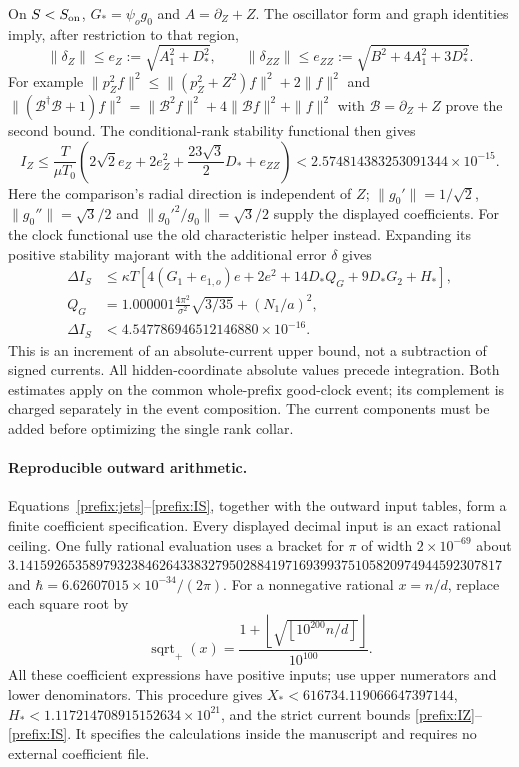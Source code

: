 \documentclass[11pt]{article}
\theoremstyle{definition}\newtheorem{definition}[theorem]{Definition}
\theoremstyle{remark}\newtheorem{remark}[theorem]{Remark}
\begin{document}
On $S<S_{\rm on}$, $G_*=\psi_og_0$ and $A=\partial_Z+Z$.
The oscillator form and graph identities imply, after restriction to
that region,
\[
 \|\delta_Z\|\le e_Z:=\sqrt{A_1^2+D_*^2},\qquad
 \|\delta_{ZZ}\|\le e_{ZZ}:=\sqrt{B^2+4A_1^2+3D_*^2}.
\]
For example $\|p_Z^2f\|^2\le\|(p_Z^2+Z^2)f\|^2+2\|f\|^2$ and
$\|(\mathcal B^\dagger\mathcal B+1)f\|^2
=\|\mathcal B^2f\|^2+4\|\mathcal Bf\|^2+\|f\|^2$ with
$\mathcal B=\partial_Z+Z$ prove the second bound.
The conditional-rank stability functional then gives
\begin{equation}
 I_Z\le\frac{T}{\mu T_0}
 \left(2\sqrt2e_Z+2e_Z^2+\frac{23\sqrt3}{2}D_*+e_{ZZ}\right)
 <2.574814383253091344\times10^{-15}.
 \label{prefix:IZ}
\end{equation}
Here the comparison's radial direction is independent of $Z$;
$\|g_0'\|=1/\sqrt2$, $\|g_0''\|=\sqrt3/2$ and
$\|g_0'^2/g_0\|=\sqrt3/2$ supply the displayed coefficients.
For the clock functional use the old characteristic helper instead.
Expanding its positive stability majorant with the additional error
$\delta$ gives
\begin{align}
 \Delta I_S&\le\kappa T\left[
 4(G_1+e_{1,o})e+2e^2+14D_*Q_G+9D_*G_2+H_*\right],\nonumber\\
 Q_G&=1.000001\frac{4\pi^2}{\sigma^2}\sqrt{3/35}+(N_1/a)^2,
 \nonumber\\[-1mm]
 \Delta I_S&<4.547786946512146880\times10^{-16}.
 \label{prefix:IS}
\end{align}
This is an increment of an absolute-current upper bound, not a
subtraction of signed currents.  All hidden-coordinate absolute values
precede integration.  Both estimates apply on the common whole-prefix
good-clock event; its complement is charged separately in the event
composition.  The current components must be added before optimizing
the single rank collar.

\paragraph{Reproducible outward arithmetic.}
Equations~\eqref{prefix:jets}--\eqref{prefix:IS}, together with the
outward input tables, form a finite coefficient specification.
Every displayed decimal input is an exact rational ceiling.
One fully rational evaluation uses a bracket for $\pi$ of width
$2\times10^{-69}$ about
$3.141592653589793238462643383279502884197169399375105820974944592307817$
and $\hbar=6.62607015\times10^{-34}/(2\pi)$.
For a nonnegative rational $x=n/d$, replace each square root by
\[
 \operatorname{sqrt}_+(x)=
 \frac{1+\left\lfloor\sqrt{\left\lfloor10^{200}n/d\right\rfloor}
                         \right\rfloor}{10^{100}}.
\]
All these coefficient expressions have positive inputs; use upper
numerators and lower denominators.  This procedure gives
$X_*<616734.119066647397144$,
$H_*<1.117214708915152634\times10^{21}$, and the strict current bounds
\eqref{prefix:IZ}--\eqref{prefix:IS}.  It specifies the calculations
inside the manuscript and requires no external coefficient file.
\end{document}
